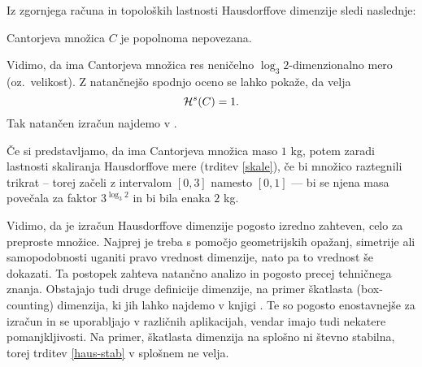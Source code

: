 Iz zgornjega računa in topoloških lastnosti Hausdorffove dimenzije sledi naslednje:
\begin{posledica}
    Cantorjeva množica \(C\) je popolnoma nepovezana.
\end{posledica}

\begin{opomba}
    Vidimo, da ima Cantorjeva množica res neničelno \(\log_3 2\)-dimenzionalno mero (oz.\ velikost). Z natančnejšo spodnjo oceno se lahko pokaže, da velja
    \[
        \mathcal{H}^s(C) = 1.
    \]
    Tak natančen izračun najdemo v \cite{pearse2014}.

    Če si predstavljamo, da ima Cantorjeva množica maso \(1\) kg, potem zaradi lastnosti skaliranja Hausdorffove mere (trditev \ref{skale}), če bi množico raztegnili trikrat -- torej začeli z intervalom \([0,3]\) namesto \([0,1]\) — bi se njena masa povečala za faktor \(3^{\log_3 2}\) in bi bila enaka \(2\) kg.
\end{opomba}

Vidimo, da je izračun Hausdorffove dimenzije pogosto izredno zahteven, celo za preproste množice. Najprej je treba s pomočjo geometrijskih opažanj, simetrije ali samopodobnosti uganiti pravo vrednost dimenzije, nato pa to vrednost še dokazati. Ta postopek zahteva natančno analizo in pogosto precej tehničnega znanja.
\newpage
Obstajajo tudi druge definicije dimenzije, na primer škatlasta (box-counting) dimenzija, ki jih lahko najdemo v knjigi \cite{fk-fg}. Te so pogosto enostavnejše za izračun in se uporabljajo v različnih aplikacijah, vendar imajo tudi nekatere pomanjkljivosti. Na primer, škatlasta dimenzija na splošno ni števno stabilna, torej trditev \ref{haus-stab} v splošnem ne velja.